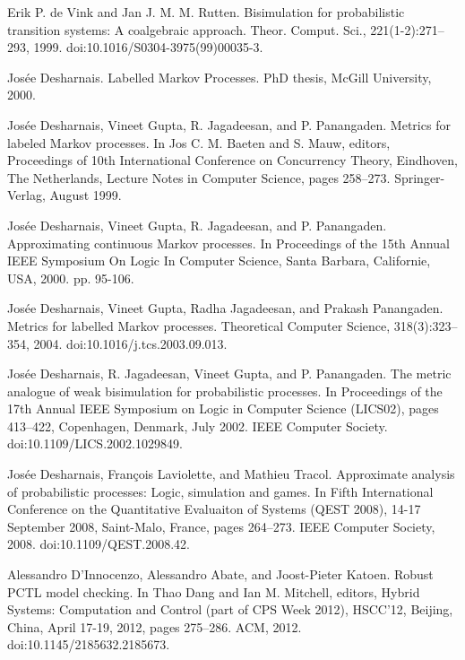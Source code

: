 \documentclass[10pt,a4paper]{article}
\begin{document}
\par\noindent  [20]  Erik P. de Vink and Jan J. M. M. Rutten.  Bisimulation for probabilistic transition systems: A coalgebraic approach.  Theor. Comput. Sci., 221(1-2):271–293, 1999.  doi:10.1016/S0304-3975(99)00035-3.  
 
\par\noindent  [21]  Josée Desharnais.  Labelled Markov Processes.  PhD thesis, McGill University, 2000.  
 
\par\noindent  [22]  Josée Desharnais, Vineet Gupta, R. Jagadeesan, and P. Panangaden.  Metrics for labeled Markov processes.  In Jos C. M. Baeten and S. Mauw, editors, Proceedings of 10th International Conference on Concurrency Theory, Eindhoven, The Netherlands, Lecture Notes in Computer Science, pages 258–273. Springer-Verlag, August 1999.  
 
\par\noindent  [23]  Josée Desharnais, Vineet Gupta, R. Jagadeesan, and P. Panangaden.  Approximating continuous Markov processes.  In Proceedings of the 15th Annual IEEE Symposium On Logic In Computer Science, Santa Barbara, Californie, USA, 2000.  pp. 95-106.  
 
\par\noindent  [24]  Josée Desharnais, Vineet Gupta, Radha Jagadeesan, and Prakash Panangaden.  Metrics for labelled Markov processes.  Theoretical Computer Science, 318(3):323–354, 2004.  doi:10.1016/j.tcs.2003.09.013.  
 
\par\noindent  [25]  Josée Desharnais, R. Jagadeesan, Vineet Gupta, and P. Panangaden.  The metric analogue of weak bisimulation for probabilistic processes.  In Proceedings of the 17th Annual IEEE Symposium on Logic in Computer Science (LICS02), pages 413–422, Copenhagen, Denmark, July 2002. IEEE Computer Society.  doi:10.1109/LICS.2002.1029849.  
 
\par\noindent  [26]  Josée Desharnais, François Laviolette, and Mathieu Tracol.  Approximate analysis of probabilistic processes: Logic, simulation and games.  In Fifth International Conference on the Quantitative Evaluaiton of Systems (QEST 2008), 14-17 September 2008, Saint-Malo, France, pages 264–273. IEEE Computer Society, 2008.  doi:10.1109/QEST.2008.42.  
 
\par\noindent  [27]  Alessandro D’Innocenzo, Alessandro Abate, and Joost-Pieter Katoen.  Robust PCTL model checking.  In Thao Dang and Ian M. Mitchell, editors, Hybrid Systems: Computation and Control (part of CPS Week 2012), HSCC’12, Beijing, China, April 17-19, 2012, pages 275–286. ACM, 2012.  doi:10.1145/2185632.2185673.  
 
\end{document}
